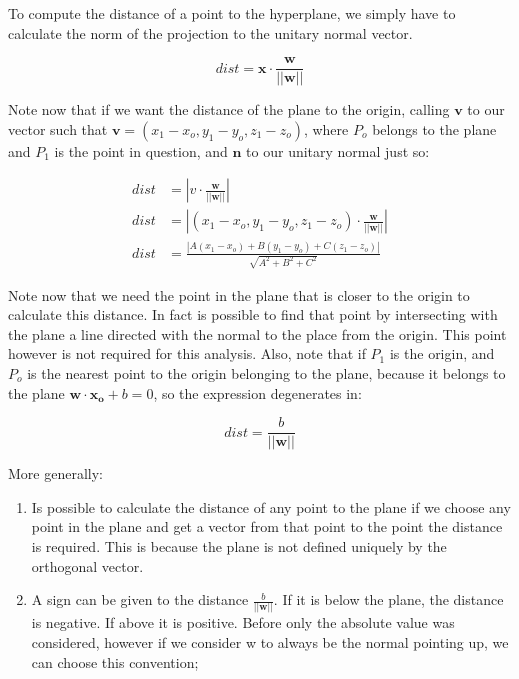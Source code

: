 To compute the distance of a point to the hyperplane, we simply have to calculate the norm of the projection to the unitary normal vector.

\begin{equation}
    dist = \mathbf{x} \cdot \frac{\mathbf{w}}{||\mathbf{w}||} 
\end{equation}

Note now that if we want the distance of the plane to the origin, calling $\mathbf{v}$ to our vector such that $\mathbf{v} = (x_1 - x_o, y_1 - y_o, z_1 - z_o)$, where $P_o$ belongs to the plane and $P_1$ is the point in question, and $\mathbf{n}$ to our unitary normal just so:

\begin{align}
    dist &= \left|v \cdot \frac{\mathbf{w}}{||\mathbf{w}||}\right| \\
    dist &= \left|(x_1 - x_o, y_1 - y_o, z_1 - z_o) \cdot \frac{\mathbf{w}}{||\mathbf{w}||}\right| \\
    dist &= \frac{\left|A(x_1 - x_o) + B(y_1 - y_o) + C(z_1 - z_o)\right|}{\sqrt{A^2 + B^2 + C^2}}
\end{align}


Note now that we need the point in the plane that is closer to the origin to calculate this distance. In fact is possible to find that point by intersecting with the plane a line directed with the normal to the place from the origin. This point however is not required for this analysis. 
Also, note that if $P_1$ is the origin, and $P_o$ is the nearest point to the origin belonging to the plane, because it belongs to the plane $\mathbf{w} \cdot \mathbf{x_o} + b = 0$, so the expression degenerates in:

\begin{equation}
    dist = \frac{b}{||\mathbf{w}||}
\end{equation}

More generally:
\begin{enumerate}
    \item Is possible to calculate the distance of any point to the plane if we choose any point in the plane and get a vector from that point to the point the distance is required. This is because the plane is not defined uniquely by the orthogonal vector. 
    \item A sign can be given to the distance $\frac{b}{||\mathbf{w}||}$. If it is below the plane, the distance is negative. If above it is positive. Before only the absolute value was considered, however if we consider w to always be the normal pointing up, we can choose this convention;
\end{enumerate}

